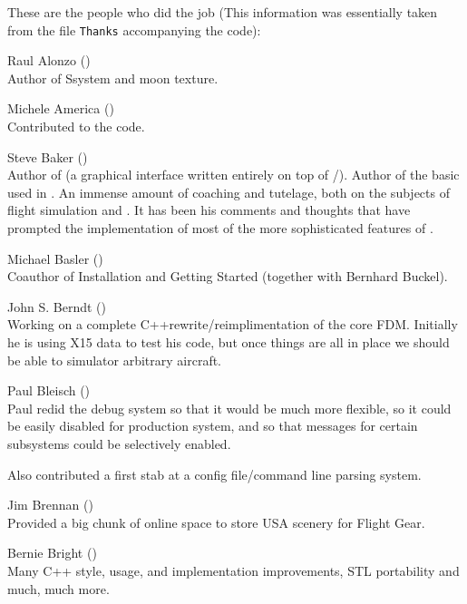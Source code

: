  \noindent
These are the people who did the job (This information was
essentially taken from the file \texttt{Thanks} accompanying the
code):
 \medskip

\noindent Raul Alonzo ()\\ Author of Ssystem and
moon texture.
 \medskip


\noindent Michele America
()\\
  Contributed to the  code.
 \medskip

\noindent Steve Baker ()\\
  Author of  (a graphical interface written entirely on top of
    /\-). Author of the basic
     used in \FlightGear. An immense amount of coaching and tutelage,
    both on the subjects of flight simulation and .  It has been
    his comments and thoughts that have prompted the implementation of
    most of the more sophisticated features of \FlightGear{\hspace{-2mm}}.
 \medskip

\noindent Michael Basler ()\\
 Coauthor of Installation and Getting Started (together with Bernhard
 Buckel).
\medskip

\noindent John S. Berndt ()\\
 Working on a complete C++rewrite/reimplimentation of the core FDM.
  Initially he is using X15 data to test his code, but once things are
  all in place we should be able to simulator arbitrary aircraft.
\medskip


\noindent Paul Bleisch ()\\
  Paul redid the debug system so that it would be much more
  flexible, so it could be easily disabled for production system, and
  so that messages for certain subsystems could be selectively
  enabled.

  Also contributed a first stab at a config file/command line parsing
  system.
 \medskip


\noindent Jim Brennan ()\\
  Provided a big chunk of online space to store USA scenery for Flight Gear.
 \medskip

\noindent Bernie Bright ()\\
  Many C++ style, usage, and implementation improvements, STL
  portability and much, much more.
 \medskip

